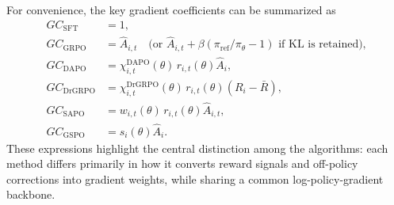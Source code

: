 \documentclass{article}
\begin{document}
For convenience, the key gradient coefficients can be summarized as
\begin{align}
GC_{\mathrm{SFT}}
&= 1,\\
GC_{\mathrm{GRPO}}
&= \hat A_{i,t}
\quad
\text{(or }
\hat A_{i,t}
+
\beta(\pi_{\mathrm{ref}}/\pi_\theta-1)
\text{ if KL is retained),}\\
GC_{\mathrm{DAPO}}
&= \chi^{\mathrm{DAPO}}_{i,t}(\theta)\,r_{i,t}(\theta)\hat A_i,\\
GC_{\mathrm{DrGRPO}}
&= \chi^{\mathrm{DrGRPO}}_{i,t}(\theta)\,r_{i,t}(\theta)(R_i-\bar R),\\
GC_{\mathrm{SAPO}}
&= w_{i,t}(\theta)\,r_{i,t}(\theta)\hat A_{i,t},\\
GC_{\mathrm{GSPO}}
&= s_i(\theta)\hat A_i.
\end{align}
These expressions highlight the central distinction among the algorithms: each method differs
primarily in how it converts reward signals and off-policy corrections into gradient weights,
while sharing a common log-policy-gradient backbone.



\newpage

\end{document}
